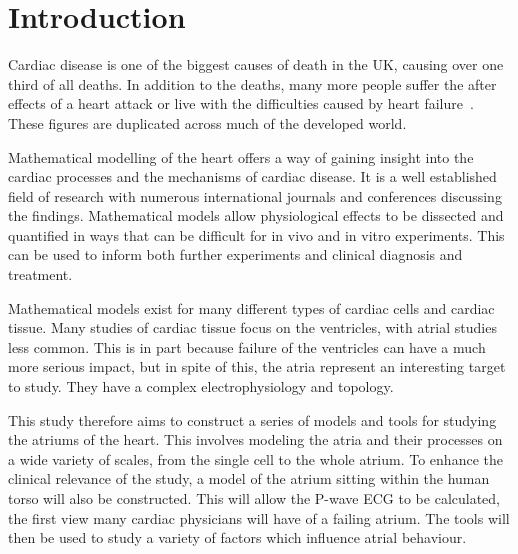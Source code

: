 \chapter{Introduction}

Cardiac disease is one of the biggest causes of death in the UK, causing over
one third of all deaths.
In addition to the deaths, many more people suffer the after effects of a heart
attack or live with the difficulties caused by heart failure~\cite{bhf2008}.
These figures are duplicated across much of the developed world.

Mathematical modelling of the heart offers a way of gaining insight into the
cardiac processes and the mechanisms of cardiac disease.
It is a well established field of research with numerous international journals
and conferences discussing the findings.
Mathematical models allow physiological effects to be dissected and quantified
in ways that can be difficult for in vivo and in vitro experiments.
This can be used to inform both further experiments and clinical diagnosis and
treatment.

Mathematical models exist for many different types of cardiac cells and
cardiac tissue.
Many studies of cardiac tissue focus on the ventricles, with atrial studies less
common.
This is in part because failure of the ventricles can have a much more serious
impact, but in spite of this, the atria represent an interesting target to
study.
They have a complex electrophysiology and topology.

This study therefore aims to construct a series of models and tools for studying
the atriums of the heart.
This involves modeling the atria and their processes on a wide variety of scales,
from the single cell to the whole atrium.
To enhance the clinical relevance of the study, a model of the atrium sitting
within the human torso will also be constructed.
This will allow the P-wave ECG to be calculated, the first view many cardiac
physicians will have of a failing atrium.
The tools will then be used to study a variety of factors which influence atrial
behaviour.







